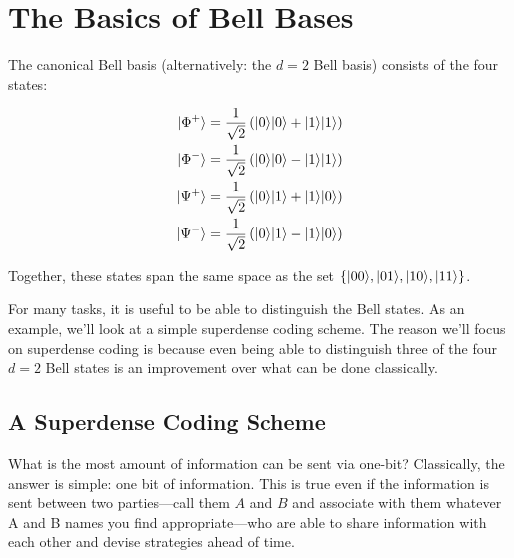 

\section{The Basics of Bell Bases}

The canonical Bell basis (alternatively: the $d=2$ Bell basis) consists of the four states:

\begin{align*}
	| \Phi^+ \rangle &= \frac{1}{\sqrt{2}} \left(| 0 \rangle| 0 \rangle + | 1 \rangle| 1 \rangle\right) \\
	| \Phi^- \rangle &= \frac{1}{\sqrt{2}} \left(| 0 \rangle| 0 \rangle - | 1 \rangle| 1 \rangle\right) \\
	| \Psi^+ \rangle &= \frac{1}{\sqrt{2}} \left(| 0 \rangle| 1 \rangle + | 1 \rangle| 0 \rangle\right) \\
	| \Psi^- \rangle &= \frac{1}{\sqrt{2}} \left(| 0 \rangle| 1 \rangle - | 1 \rangle| 0 \rangle\right)
\end{align*}

Together, these states span the same space as the set $\{| 00 \rangle, | 01 \rangle, | 10 \rangle, | 11 \rangle\}$.

For many tasks, it is useful to be able to distinguish the Bell states. As an example, we'll look at a simple superdense coding scheme. The reason we'll focus on superdense coding is because even being able to distinguish three of the four $d=2$ Bell states is an improvement over what can be done classically.

\subsection{A Superdense Coding Scheme}

What is the most amount of information can be sent via one-bit? Classically, the answer is simple: one bit of information. This is true even if the information is sent between two parties---call them $A$ and $B$ and associate with them whatever A and B names you find appropriate---who are able to share information with each other and devise strategies ahead of time.

